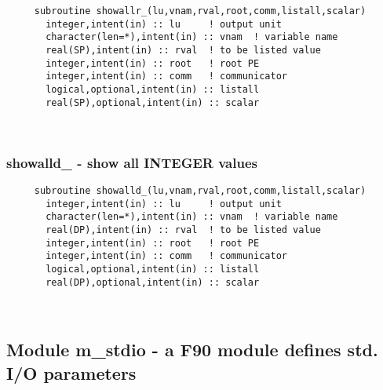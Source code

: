 \begin{verbatim} 
     subroutine showallr_(lu,vnam,rval,root,comm,listall,scalar)
       integer,intent(in) :: lu		! output unit
       character(len=*),intent(in) :: vnam	! variable name
       real(SP),intent(in) :: rval	! to be listed value
       integer,intent(in) :: root	! root PE
       integer,intent(in) :: comm	! communicator
       logical,optional,intent(in) :: listall
       real(SP),optional,intent(in) :: scalar
 \end{verbatim}%
 
 
\mbox{}\hrulefill\ 
 
  \subsubsection{showalld\_ - show all INTEGER values}

\begin{verbatim} 
     subroutine showalld_(lu,vnam,rval,root,comm,listall,scalar)
       integer,intent(in) :: lu		! output unit
       character(len=*),intent(in) :: vnam	! variable name
       real(DP),intent(in) :: rval	! to be listed value
       integer,intent(in) :: root	! root PE
       integer,intent(in) :: comm	! communicator
       logical,optional,intent(in) :: listall
       real(DP),optional,intent(in) :: scalar
 \end{verbatim}%


 
 
\mbox{}\hrulefill\ 
 
  \subsection{Module m\_stdio - a F90 module defines std. I/O parameters }

